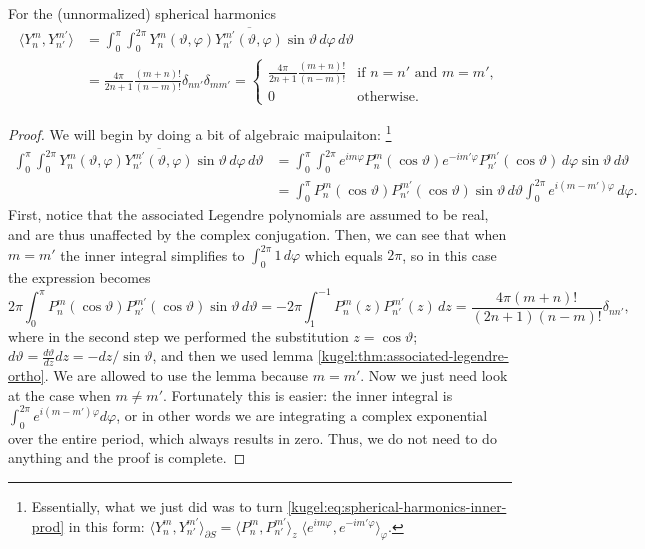 \begin{theorem} For the (unnormalized) spherical harmonics
  \label{kugel:thm:spherical-harmonics-ortho}
  \begin{align}
    \langle Y^m_n, Y^{m'}_{n'} \rangle
    &= \int_{0}^\pi \int_0^{2\pi}
      Y^m_n(\vartheta, \varphi) \overline{Y^{m'}_{n'}(\vartheta, \varphi)}
      \sin \vartheta \, d\varphi \, d\vartheta
      \label{kugel:eq:spherical-harmonics-inner-prod} \\
    &= \frac{4\pi}{2n + 1} \frac{(m + n)!}{(n - m)!} \delta_{nn'} \delta_{mm'}
    = \begin{cases}
      \frac{4\pi}{2n + 1} \frac{(m + n)!}{(n - m)!}
        & \text{if } n = n' \text{ and } m = m', \nonumber \\
      0 & \text{otherwise}.
    \end{cases}
  \end{align}
\end{theorem}
\begin{proof}
  We will begin by doing a bit of algebraic maipulaiton:
  \footnote{
    Essentially, what we just did was to turn
    \eqref{kugel:eq:spherical-harmonics-inner-prod} in this form:
    \(
      \langle Y^m_n, Y^{m'}_{n'} \rangle_{\partial S}
      = \langle P^m_n, P^{m'}_{n'} \rangle_z
      \; \langle e^{im\varphi}, e^{-im'\varphi} \rangle_\varphi
    \).
  }
  \begin{align*}
    \int_{0}^\pi \int_0^{2\pi}
      Y^m_n(\vartheta, \varphi) \overline{Y^{m'}_{n'}(\vartheta, \varphi)} 
      \sin \vartheta \, d\varphi \, d\vartheta
    &= \int_{0}^\pi \int_0^{2\pi}
      e^{im\varphi} P^m_n(\cos \vartheta)
      e^{-im'\varphi} P^{m'}_{n'}(\cos \vartheta)
      \, d\varphi \sin \vartheta \, d\vartheta 
    \\
    &= \int_{0}^\pi
      P^m_n(\cos \vartheta) P^{m'}_{n'}(\cos \vartheta) \sin \vartheta \, d\vartheta
      \int_0^{2\pi} e^{i(m - m')\varphi}
      \, d\varphi. 
  \end{align*}
  First, notice that the associated Legendre polynomials are assumed to be real,
  and are thus unaffected by the complex conjugation. Then, we can see that when
  $m = m'$ the inner integral simplifies to $\int_0^{2\pi} 1 \, d\varphi$ which
  equals $2\pi$, so in this case the expression becomes
  \begin{equation*}
    2\pi \int_{0}^\pi
      P^m_n(\cos \vartheta) P^{m'}_{n'}(\cos \vartheta)
    \sin \vartheta \, d\vartheta
    = -2\pi \int_{1}^{-1} P^m_n(z) P^{m'}_{n'}(z) \, dz
    = \frac{4\pi(m + n)!}{(2n + 1)(n - m)!} \delta_{nn'},
  \end{equation*}
  where in the second step we performed the substitution $z = \cos\vartheta$;
  $d\vartheta = \frac{d\vartheta}{dz} dz= - dz / \sin \vartheta$, and then we
  used lemma \ref{kugel:thm:associated-legendre-ortho}.  We are allowed to use
  the lemma because $m = m'$. Now we just need look at the case when $m \neq
  m'$. Fortunately this is easier: the inner integral is $\int_0^{2\pi} e^{i(m -
  m')\varphi} d\varphi$, or in other words we are integrating a complex
  exponential over the entire period, which always results in zero. Thus, we do
  not need to do anything and the proof is complete.
\end{proof}

